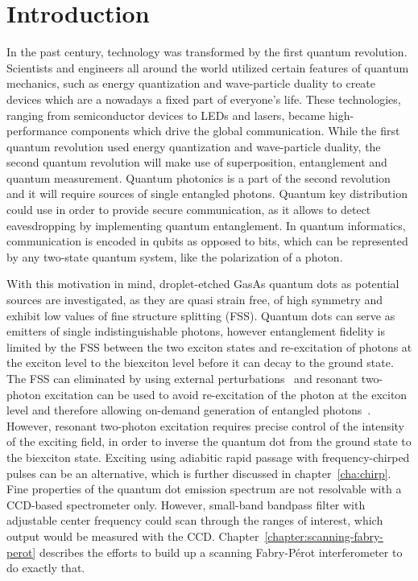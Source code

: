 \chapter{Introduction}

In the past century, technology was transformed by the first quantum revolution. Scientists and engineers all around the world utilized certain features of quantum mechanics, such as energy quantization and wave-particle duality to create devices which are a nowadays a fixed part of everyone's life.
These technologies, ranging from semiconductor devices to LEDs and lasers, became high-performance components which drive the global communication.
While the first quantum revolution used energy quantization and wave-particle duality, the second quantum revolution will make use of superposition, entanglement and quantum measurement.
Quantum photonics is a part of the second revolution and it will require sources of single entangled photons.
Quantum key distribution could use in order to provide secure communication, as it allows to detect eavesdropping by implementing quantum entanglement.
In quantum informatics, communication is encoded in qubits as opposed to bits, which can be represented by any two-state quantum system, like the polarization of a photon.

With this motivation in mind, droplet-etched GasAs quantum dots as potential sources are investigated, as they are quasi strain free, of high symmetry and exhibit low values of fine structure splitting (\acs{FSS}).
Quantum dots can serve as emitters of single indistinguishable photons, however entanglement fidelity is limited by the \acs{FSS} between the two exciton states \cite{bayer_fine_2002} and re-excitation of photons at the exciton level to the biexciton level before it can decay to the ground state.
The FSS can eliminated by using external perturbations~\cite{plumhof_experimental_2012} and resonant two-photon excitation can be used to avoid re-excitation of the photon at the exciton level and therefore allowing on-demand generation of entangled photons~\cite{jayakumar_deterministic_2013}.
However, resonant two-photon excitation requires precise control of the intensity of the exciting field, in order to inverse the quantum dot from the ground state to the biexciton state.
Exciting using adiabitic rapid passage with frequency-chirped pulses can be an alternative, which is further discussed in chapter~\ref{cha:chirp}.
Fine properties of the quantum dot emission spectrum are not resolvable with a CCD-based spectrometer only.
However, small-band bandpass filter with adjustable center frequency could scan through the ranges of interest, which output would be measured with the CCD.
Chapter~\ref{chapter:scanning-fabry-perot} describes the efforts to build up a scanning Fabry-Pérot interferometer to do exactly that.


